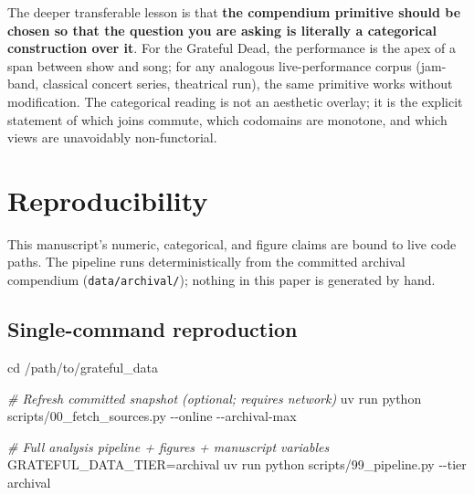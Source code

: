 \documentclass[
]{article}
\newenvironment{Shaded}{}{}
\newcommand{\AttributeTok}[1]{\textcolor[rgb]{0.49,0.56,0.16}{#1}}
\newcommand{\BuiltInTok}[1]{\textcolor[rgb]{0.00,0.50,0.00}{#1}}
\newcommand{\CommentTok}[1]{\textcolor[rgb]{0.38,0.63,0.69}{\textit{#1}}}
\newcommand{\ExtensionTok}[1]{#1}
\newcommand{\NormalTok}[1]{#1}
\newcommand{\OperatorTok}[1]{\textcolor[rgb]{0.40,0.40,0.40}{#1}}
\newcommand{\VariableTok}[1]{\textcolor[rgb]{0.10,0.09,0.49}{#1}}
\begin{document}
The deeper transferable lesson is that \textbf{the compendium primitive
should be chosen so that the question you are asking is literally a
categorical construction over it}. For the Grateful Dead, the
performance is the apex of a span between show and song; for any
analogous live-performance corpus (jam-band, classical concert series,
theatrical run), the same primitive works without modification. The
categorical reading is not an aesthetic overlay; it is the explicit
statement of which joins commute, which codomains are monotone, and
which views are unavoidably non-functorial.

\newpage

\section{Reproducibility}\label{reproducibility}

This manuscript's numeric, categorical, and figure claims are bound to
live code paths. The pipeline runs deterministically from the committed
archival compendium (\texttt{data/archival/}); nothing in this paper is
generated by hand.

\subsection{Single-command
reproduction}\label{single-command-reproduction}

\begin{Shaded}
\begin{Highlighting}[]
\BuiltInTok{cd}\NormalTok{ /path/to/grateful\_data}

\CommentTok{\# Refresh committed snapshot (optional; requires network)}
\ExtensionTok{uv}\NormalTok{ run python scripts/00\_fetch\_sources.py }\AttributeTok{{-}{-}online} \AttributeTok{{-}{-}archival{-}max}

\CommentTok{\# Full analysis pipeline + figures + manuscript variables}
\VariableTok{GRATEFUL\_DATA\_TIER}\OperatorTok{=}\NormalTok{archival }\ExtensionTok{uv}\NormalTok{ run python scripts/99\_pipeline.py }\AttributeTok{{-}{-}tier}\NormalTok{ archival}
\end{Highlighting}
\end{Shaded}
\end{document}
